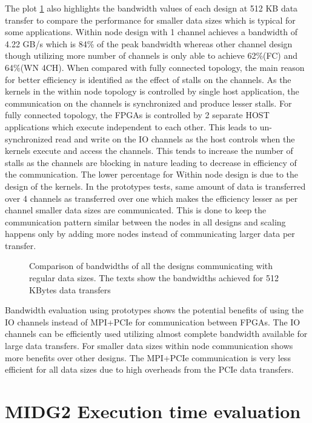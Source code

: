 The plot \ref{plot:allreg} also highlights the bandwidth values
of each design at 512 KB data transfer to compare the performance for smaller data sizes which is typical
for some applications. Within node design with 1 channel achieves a bandwidth of 4.22 GB/s which is 84\%
of the peak bandwidth whereas other channel design though utilizing more number of channels is only able
to achieve 62\%(FC) and 64\%(WN 4CH). When compared with fully connected topology, the main reason
for better efficiency is identified as the effect of stalls on the channels. As the kernels in the
within node topology is controlled by single host application, the communication on the channels is
synchronized and produce lesser stalls. For fully connected topology, the FPGAs is controlled
by 2 separate HOST applications which execute independent to each other. This leads to un-synchronized
read and write on the IO channels as the host controls when the kernels execute and access the channels.
This tends to increase the number of stalls as the channels are blocking in nature leading to decrease in
efficiency of the communication. The lower percentage for Within node design is due to the design of the
kernels. In the prototypes tests, same amount of data is transferred over 4 channels as transferred
over one which makes the efficiency lesser as per channel smaller data sizes are communicated. This
is done to keep the communication pattern similar between the nodes in all designs and scaling
happens only by adding more nodes instead of communicating larger data per transfer.

\begin{figure}[ht]
    \centering
    \scalebox{0.8}{}
    \caption{Comparison of bandwidths of all the designs communicating with regular data sizes.
    The texts show the bandwidths achieved for 512 KBytes data transfers}
    \label{plot:allreg}
\end{figure}


Bandwidth evaluation using prototypes shows the potential benefits of using
the IO channels instead of MPI+PCIe for communication between FPGAs. The IO
channels can be efficiently used utilizing almost complete bandwidth
available for large data transfers. For smaller data sizes within
node communication shows more benefits over other designs. The MPI+PCIe
communication is very less efficient for all data sizes due to high overheads
from the PCIe data transfers.

\section{MIDG2 Execution time evaluation}

